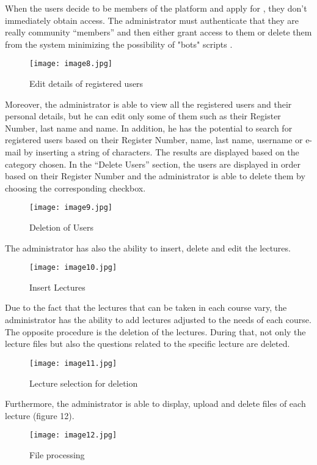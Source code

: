 \documentclass[10pt, conference, compsocconf]{IEEEtran}
\begin{document}
When the users decide to be members of the platform and apply for , they don’t immediately obtain access. The administrator must authenticate that they are really community “members” and then either grant access to them or delete them from the system minimizing the possibility of "bots" scripts .

\begin{figure}[!h]
	\centering
	\texttt{[image: image8.jpg]}
	\caption{Edit details of registered users }
\end{figure}


Moreover, the administrator is able to view all the registered users and their personal details, but he can edit only some of them such as their Register Number, last name and name. In addition, he has the potential to search for registered users based on their Register Number, name, last name, username or e-mail by inserting a  string of characters. The results are displayed based on the category chosen.  In the “Delete Users” section, the users are displayed in order based on their Register Number and the administrator is able to delete them by choosing the corresponding checkbox.


\begin{figure}[!h]
	\centering
	\texttt{[image: image9.jpg]}
	\caption{Deletion of Users}
\end{figure}

The administrator has also the ability to insert, delete and edit the lectures.

\begin{figure}[!h]
	\centering
	\texttt{[image: image10.jpg]}
	\caption{Insert Lectures}
\end{figure}

Due to the fact that the lectures that can be taken in each course vary, the administrator has the ability to add lectures adjusted to the needs of each course.
The opposite procedure is the deletion of the lectures. During that, not only the lecture files but also the questions related to the specific lecture are deleted.

\begin{figure}[!h]
	\centering
	\texttt{[image: image11.jpg]}
	\caption{Lecture selection for deletion}
\end{figure}


Furthermore, the administrator is able to display, upload and delete files of each lecture (figure 12).  

\begin{figure}[!h]
	\centering
	\texttt{[image: image12.jpg]}
	\caption{File processing}
\end{figure}
\end{document}
